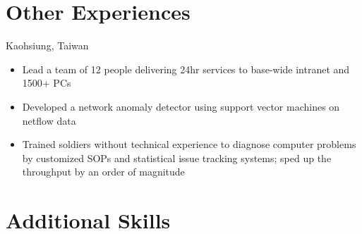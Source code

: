\documentclass[11pt,letterpaper,sans]{moderncv}
\begin{document}


	\nocite{wu2013stac}
	\nocite{wu2013dna}
	\nocite{tassa2013}
	\nocite{wu2012semi}
	\nocite{wu2011action}
	\nocite{wu2010facial}
	\nocite{wu2009learning}
	\nocite{wu2004probability}


	
 
\section{Other Experiences}
	 {Kaohsiung, Taiwan}
	{
 		\begin{itemize}\parskip=0pt\vspace*{-3pt}
 			\item Lead a team of 12 people delivering 24hr services to base-wide intranet and 1500+ PCs
			\item Developed a network anomaly detector using support vector machines on netflow data
			\item Trained soldiers without technical experience to diagnose computer problems by customized SOPs and statistical issue tracking systems;
			sped up the throughput by an order of magnitude
 		\end{itemize}
	}
  \section{Additional Skills}
\end{document}
